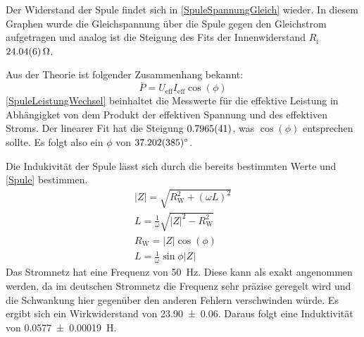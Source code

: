 \documentclass[
	a4paper,
	12pt,
	pagesize,
	ngerman
]{scrartcl}
\begin{document}
	Der Widerstand der Spule findet sich in \cref{SpuleSpannungGleich} wieder. 
	In diesem Graphen wurde die Gleichspannung über die Spule gegen den Gleichstrom aufgetragen und analog ist die Steigung des Fits der Innenwiderstand $R_\text{i}$ $\SI{24,04 \pm 0,06}{\Omega}$.

	Aus der Theorie ist folgender Zusammenhang bekannt:
	\begin{equation}
		\bar{P} = U_\text{eff} I_\text{eff} \cos(\phi)
	\end{equation}
	\cref{SpuleLeistungWechsel} beinhaltet die Messwerte für die effektive Leistung in Abhängigket von dem Produkt der effektiven Spannung und des effektiven Stroms. 
	Der linearer Fit hat die Steigung $\SI{0,7965\pm 0,0041}{}$, was $\cos(\phi)$ entsprechen sollte. 
	Es folgt also ein $\phi$ von $\ang{37,202\pm 0,385}$.

	Die Indukivität der Spule lässt sich durch die bereits bestimmten Werte und \cref{Spule} bestimmen.
	\begin{gather}
		\label{Spule}
		|Z| = \sqrt{R_\text{W}^2 + (\omega L)^2} \\
		L = \frac{1}{\omega}\sqrt{|Z|^2-R_\text{W}^2} \\
		R_\text{W} = |Z| \cos(\phi)  \\
		L = \frac{1}{\omega} \sin{\phi} |Z|
	\end{gather}
		Das Stromnetz hat eine Frequenz von \SI{50}{Hz}. %
		Diese kann als exakt angenommen werden, da im deutschen Stromnetz die Frequenz sehr präzise geregelt wird und die Schwankung hier gegenüber den anderen Fehlern verschwinden würde.
		Es ergibt sich ein Wirkwiderstand von \SI{23,90 \pm 0,06}{\Omega}.
		Daraus folgt eine Induktivität von \SI{0,0577 \pm 0,00019}{H}. %
	
\end{document}
